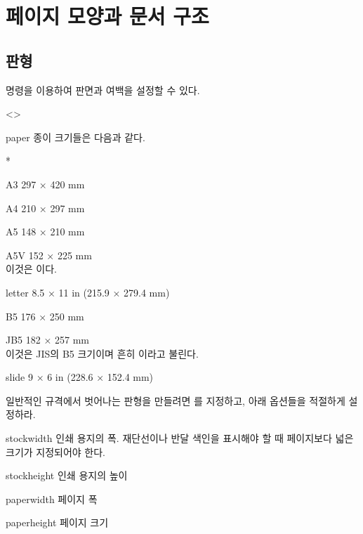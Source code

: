 \documentclass[pairquote, minted]{hzguide}
\begin{document}
\ChapterContentsEnable

\chapter{페이지 모양과 문서 구조}

\section{판형}
\label{sec:layout}

\macro{\LayoutSetup} 명령을 이용하여 판면과 여백을 설정할 수 있다.

\begin{code}
\end{code}

\begin{macros}<\LayoutSetup>
\item[paper] 
종이 크기들은 다음과 같다.
\begin{macros}*
\item[A3] 297 × 420 mm 
\item[A4] 210 × 297 mm 
\item[A5] 148 × 210 mm 
\item[A5V] 152 × 225 mm \\ 이것은 이다.
\item[letter] 8.5 × 11 in (215.9 × 279.4 mm)
\item[B5] 176 × 250 mm
\item[JB5] 182 × 257 mm \\ 이것은 JIS의 B5 크기이며 흔히 이라고 불린다.
\item[slide] 9 × 6 in (228.6 × 152.4 mm)
\end{macros}

일반적인 규격에서 벗어나는 판형을 만들려면 를 지정하고, 아래 옵션들을 적절하게 설정하라.

\item[stockwidth] \keyvalue{250mm}
인쇄 용지의 폭. 재단선이나 반달 색인을 표시해야 할 때 페이지보다 넓은 크기가 지정되어야 한다.

\item[stockheight] \keyvalue{353mm}
인쇄 용지의 높이

\item[paperwidth] \keyvalue{210mm}
페이지 폭

\item[paperheight] \keyvalue{297mm}
페이지 크기


\end{macros}
\end{document}
